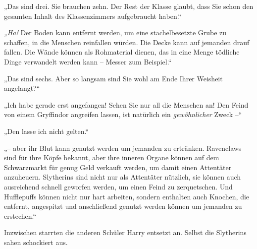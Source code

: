 „Das sind drei. Sie brauchen zehn. Der Rest der Klasse glaubt, dass Sie schon den gesamten Inhalt des Klassenzimmers aufgebraucht haben.“

\emph{„Ha!} Der Boden kann entfernt werden, um eine stachelbesetzte Grube zu schaffen, in die Menschen reinfallen würden. Die Decke kann auf jemanden drauf fallen. Die Wände können als Rohmaterial dienen, das in eine Menge tödliche Dinge verwandelt werden kann – Messer zum Beispiel.“

„Das sind sechs. Aber so langsam sind Sie wohl am Ende Ihrer Weisheit angelangt?“

„Ich habe gerade erst angefangen! Sehen Sie nur all die Menschen an! Den Feind von einem Gryffindor angreifen lassen, ist natürlich ein \emph{gewöhnlicher} Zweck –“

„Den lasse ich nicht gelten.“

„– aber ihr Blut kann genutzt werden um jemanden zu ertränken. Ravenclaws sind für ihre Köpfe bekannt, aber ihre inneren Organe können auf dem Schwarzmarkt für genug Geld verkauft werden, um damit einen Attentäter anzuheuern. Slytherins sind nicht nur als Attentäter nützlich, sie können auch ausreichend schnell geworfen werden, um einen Feind zu zerquetschen. Und Hufflepuffs können nicht nur hart arbeiten, sondern enthalten auch Knochen, die entfernt, angespitzt und anschließend genutzt werden können um jemanden zu erstechen.“

Inzwischen starrten die anderen Schüler Harry entsetzt an. Selbst die Slytherins sahen schockiert aus.


